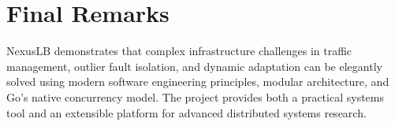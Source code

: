 \documentclass[12pt,openany]{report}
\begin{document}
\section{Final Remarks}

NexusLB demonstrates that complex infrastructure challenges in traffic management, outlier fault isolation, and dynamic adaptation can be elegantly solved using modern software engineering principles, modular architecture, and Go's native concurrency model. The project provides both a practical systems tool and an extensible platform for advanced distributed systems research.

\clearpage
{}
{}
\end{document}
